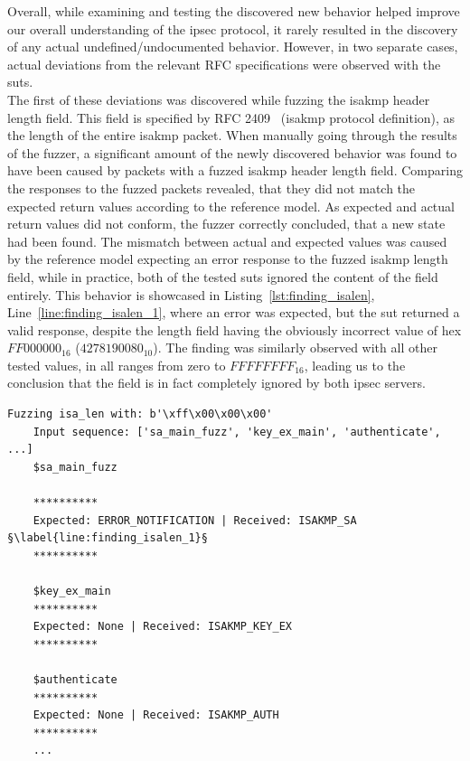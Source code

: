 Overall, while examining and testing the discovered new behavior helped improve our overall understanding of the \ac{ipsec} protocol, it rarely resulted in the discovery of any actual undefined/undocumented behavior. However, in two separate cases, actual deviations from the relevant RFC specifications were observed with the \acp{sut}. \\

The first of these deviations was discovered while fuzzing the \ac{isakmp} header length field. This field is specified by RFC 2409~\cite{rfc:isakmp} (\ac{isakmp} protocol definition), as the length of the entire \ac{isakmp} packet. When manually going through the results of the fuzzer, a significant amount of the newly discovered behavior was found to have been caused by packets with a fuzzed \ac{isakmp} header length field. Comparing the responses to the fuzzed packets revealed, that they did not match the expected return values according to the reference model. As expected and actual return values did not conform, the fuzzer correctly concluded, that a new state had been found. The mismatch between actual and expected values was caused by the reference model expecting an error response to the fuzzed \ac{isakmp} length field, while in practice, both of the tested \acp{sut} ignored the content of the field entirely. This behavior is showcased in Listing~\ref{lst:finding_isalen}, Line~\ref{line:finding_isalen_1}, where an error was expected, but the \ac{sut} returned a valid response, despite the length field having the obviously incorrect value of hex $FF000000_{16}$ ($4278190080_{10}$). The finding was similarly observed with all other tested values, in all ranges from zero to $FFFFFFFF_{16}$, leading us to the conclusion that the field is in fact completely ignored by both \ac{ipsec} servers. \\
\vspace{3mm}
\begin{lstlisting}[float=h, caption=Discovered finding showing the ISAKMP length field being ignored., label=lst:finding_isalen, escapechar=§]
	Fuzzing isa_len with: b'\xff\x00\x00\x00'
	Input sequence: ['sa_main_fuzz', 'key_ex_main', 'authenticate', ...]
	$sa_main_fuzz

	**********
	Expected: ERROR_NOTIFICATION | Received: ISAKMP_SA §\label{line:finding_isalen_1}§
	**********
	
	$key_ex_main
	**********
	Expected: None | Received: ISAKMP_KEY_EX
	**********
	
	$authenticate
	**********
	Expected: None | Received: ISAKMP_AUTH
	**********
	...
\end{lstlisting}
